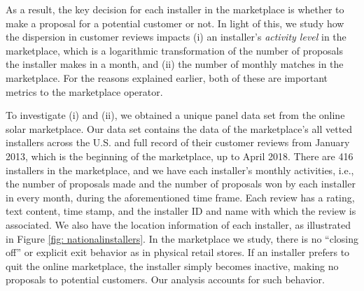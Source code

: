 \documentclass[msom,blindrev]{informs3}
\begin{document}
%	
%	
	
	As a result, the key decision for each installer in the marketplace is whether to make a proposal for a potential customer or not. In light of this, we study how the dispersion in customer reviews impacts (i) an installer's \emph{activity level} in the marketplace, which is a logarithmic transformation of the number of proposals the installer makes in a month, and (ii) the number of monthly matches in the marketplace. For the reasons explained earlier, both of these are important metrics to the marketplace operator.
	
	
	
	To investigate (i) and (ii), we obtained a unique panel data set from the online solar marketplace. Our data set contains the data of the marketplace's all vetted installers across the U.S. and full record of their customer reviews from January 2013, which is the beginning of the marketplace, up to April 2018. There are 416 installers in the marketplace, and we have each installer's monthly activities, i.e., the number of proposals made and the number of proposals won by each installer in every month, during the aforementioned time frame. Each review has a rating, text content, time stamp, and the installer ID and name with which the review is associated. We also have the location information of each installer, as illustrated in Figure \ref{fig: nationalinstallers}. In the marketplace we study, there is no ``closing off'' or explicit exit behavior as in physical retail stores. If an installer prefers to quit the online marketplace, the installer simply becomes inactive, making no proposals to potential customers. Our analysis accounts for such behavior.
	
	
	
	
\end{document}
